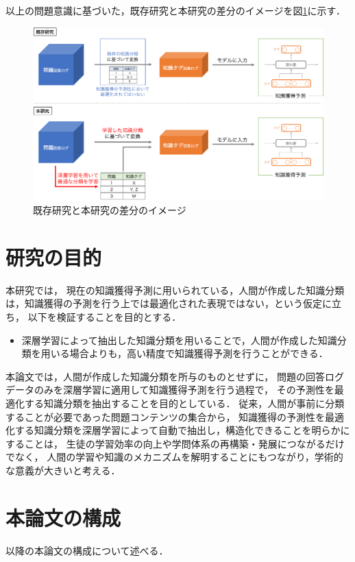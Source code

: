 以上の問題意識に基づいた，既存研究と本研究の差分のイメージを図\ref{fig:problem}に示す．

\begin{figure}[htb]
\begin{center}
\includegraphics[width=400pt]{./img/problem3.pdf}
\end{center}
\caption{既存研究と本研究の差分のイメージ}
\label{fig:problem}
\end{figure}


\section{研究の目的}
本研究では，
現在の知識獲得予測に用いられている，人間が作成した知識分類は，知識獲得の予測を行う上では最適化された表現ではない，という仮定に立ち，
以下を検証することを目的とする．

\begin{itemize}
\item 深層学習によって抽出した知識分類を用いることで，人間が作成した知識分類を用いる場合よりも，高い精度で知識獲得予測を行うことができる．
\end{itemize}

本論文では，人間が作成した知識分類を所与のものとせずに，
問題の回答ログデータのみを深層学習に適用して知識獲得予測を行う過程で，
その予測性を最適化する知識分類を抽出することを目的としている．
従来，人間が事前に分類することが必要であった問題コンテンツの集合から，
知識獲得の予測性を最適化する知識分類を深層学習によって自動で抽出し，構造化できることを明らかにすることは，
生徒の学習効率の向上や学問体系の再構築・発展につながるだけでなく，
人間の学習や知識のメカニズムを解明することにもつながり，学術的な意義が大きいと考える．


\section{本論文の構成}
以降の本論文の構成について述べる．

